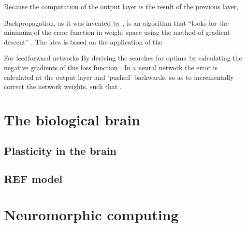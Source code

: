 \documentclass[report.tex]{subfiles}
\begin{document}
Because the computation of the output layer is the result of the
previous layer,

Backpropagation, as it was invented by
\textcite{Rumelhart1988}, is an algorithm that ``looks for the minimum
of the error function in weight space using the method
of gradient descent'' \cite[p. 151]{Rojas1996}.
The idea is based on the application of the 

For feedforward networks By deriving the 
searches for optima by calculating the negative
gradients of this loss function \cite{Rumelhart1988}.
In a neural network the error is calculated at the output
layer and `pushed' backwards, so as to incrementally 
correct the network weights, such that .




\section{The biological brain}
\subsection{Plasticity in the brain}
\subsection{REF model} \label{sec:ref}

\section{Neuromorphic computing}
\end{document}
